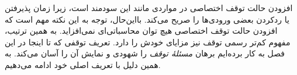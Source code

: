 \documentclass[../../../include/open-logic-section]{subfiles}
\begin{document}
\begin{explain}
افزودن حالت توقف اختصاصی در مواردی مانند این سودمند است، زیرا زمان
پذیرفتن یا ردکردن بعضی ورودی‌ها را صریح می‌کند. بااین‌حال، توجه به
این نکته مهم است که افزودن حالت توقف اختصاصی هیچ توان محاسباتی‌ای
نمی‌افزاید. به همین ترتیب، مفهوم کم‌تر رسمی توقف نیز مزایای خودش را
دارد. تعریف توقفی که تا اینجا در این فصل به کار برده‌ایم برهان
\emph{مسئلهٔ توقف} را شهودی و نمایش آن را آسان می‌کند. به همین دلیل
با تعریف اصلی خود ادامه می‌دهیم.
\end{explain}
\end{document}
